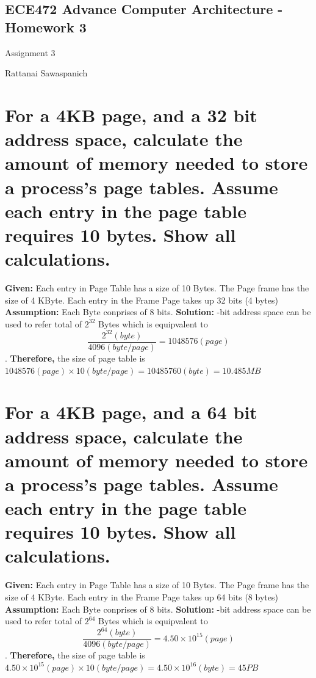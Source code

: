 \documentclass[letterpaper,10pt,titlepage,fleqn]{article}
\begin{document}
\pagestyle{empty}

\begin{center}
   \section*{ECE472 Advance Computer Architecture - Homework 3}
   Assignment 3

   Rattanai Sawaspanich
\end{center}


\section*{For a 4KB page, and a 32 bit address space, calculate the amount of memory needed to store a process's page tables. Assume each entry in the page table requires 10 bytes. Show all calculations.}
\textbf{Given: }
Each entry in Page Table has a size of 10 Bytes. 
The Page frame has the size of 4 KByte. \newline
Each entry in the Frame Page takes up 32 bits (4 bytes)\newline
\textbf{Assumption: } Each Byte conprises of 8 bits. \newline
\textbf{Solution: }-bit address space can be used to refer total of $ 2^{32} $ Bytes\newline
which is equipvalent to \[ \dfrac{2^{32}(byte)}{4096 (byte/page)} = 1048576 (page) \] .\newline
\textbf{Therefore, }the size of page table is $ 1048576 (page) \times 10 (byte/page) = 10485760 (byte) = 10.485 MB$

\section*{For a 4KB page, and a 64 bit address space, calculate the amount of memory needed to store a process's page tables. Assume each entry in the page table requires 10 bytes. Show all calculations.}
\textbf{Given: }
Each entry in Page Table has a size of 10 Bytes. 
The Page frame has the size of 4 KByte. \newline
Each entry in the Frame Page takes up 64 bits (8 bytes)\newline
\textbf{Assumption: } Each Byte conprises of 8 bits. \newline
\textbf{Solution: }-bit address space can be used to refer total of $ 2^{64} $ Bytes\newline
which is equipvalent to \[ \dfrac{2^{64}(byte)}{4096 (byte/page)} = 4.50 \times 10^{15} (page) \] .\newline
\textbf{Therefore, }the size of page table is $ 4.50 \times 10^{15} (page) \times 10 (byte/page) = 4.50 \times
10^{16} (byte) = 45 PB$
\end{document}
